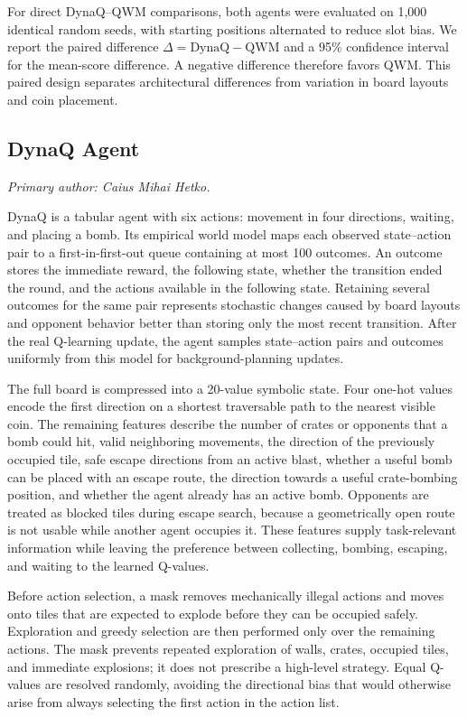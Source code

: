 \documentclass[article, 10pt]{IEEEtran}
\begin{document}
For direct DynaQ--QWM comparisons, both agents were evaluated on 1,000 identical random seeds, with starting positions alternated to reduce slot bias. We report the paired difference $\Delta=\mathrm{DynaQ}-\mathrm{QWM}$ and a 95\% confidence interval for the mean-score difference. A negative difference therefore favors QWM. This paired design separates architectural differences from variation in board layouts and coin placement.

\subsection{DynaQ Agent}\label{subsec:DynaQ Methods}\label{sec:dyna_method}

\textit{Primary author: Caius Mihai Hetko.}

DynaQ is a tabular agent with six actions: movement in four directions, waiting, and placing a bomb. Its empirical world model maps each observed state--action pair to a first-in-first-out queue containing at most 100 outcomes. An outcome stores the immediate reward, the following state, whether the transition ended the round, and the actions available in the following state. Retaining several outcomes for the same pair represents stochastic changes caused by board layouts and opponent behavior better than storing only the most recent transition. After the real Q-learning update, the agent samples state--action pairs and outcomes uniformly from this model for background-planning updates.

The full board is compressed into a 20-value symbolic state. Four one-hot values encode the first direction on a shortest traversable path to the nearest visible coin. The remaining features describe the number of crates or opponents that a bomb could hit, valid neighboring movements, the direction of the previously occupied tile, safe escape directions from an active blast, whether a useful bomb can be placed with an escape route, the direction towards a useful crate-bombing position, and whether the agent already has an active bomb. Opponents are treated as blocked tiles during escape search, because a geometrically open route is not usable while another agent occupies it. These features supply task-relevant information while leaving the preference between collecting, bombing, escaping, and waiting to the learned Q-values.

Before action selection, a mask removes mechanically illegal actions and moves onto tiles that are expected to explode before they can be occupied safely. Exploration and greedy selection are then performed only over the remaining actions. The mask prevents repeated exploration of walls, crates, occupied tiles, and immediate explosions; it does not prescribe a high-level strategy. Equal Q-values are resolved randomly, avoiding the directional bias that would otherwise arise from always selecting the first action in the action list.
\end{document}

